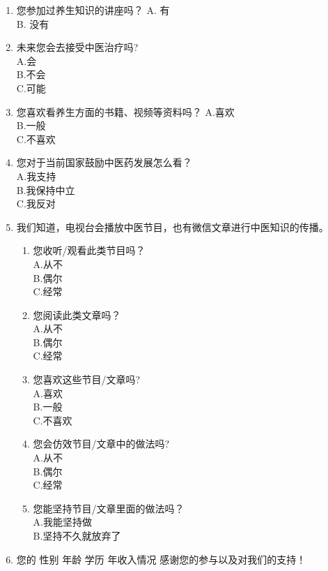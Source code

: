 \begin{enumerate}
\item 
您参加过养生知识的讲座吗？
A. 有\\
B. 没有

\item 
未来您会去接受中医治疗吗?\\
A.会\\
B.不会\\
C.可能


\item 您喜欢看养生方面的书籍、视频等资料吗？
A.喜欢\\
B.一般\\
C.不喜欢\\

\item 
您对于当前国家鼓励中医药发展怎么看？\\
A.我支持\\
B.我保持中立\\
C.我反对

\item 
我们知道，电视台会播放中医节目，也有微信文章进行中医知识的传播。
\begin{enumerate}
	\item 
   您收听/观看此类节目吗？\\
    A.从不\\
    B.偶尔\\
    C.经常

\item 
    您阅读此类文章吗？\\
    A.从不\\
    B.偶尔\\
    C.经常
    
    \item 
    您喜欢这些节目/文章吗?\\
    A.喜欢\\
    B.一般\\
    C.不喜欢
    
    \item 
    您会仿效节目/文章中的做法吗?\\
    A.从不\\
    B.偶尔\\
    C.经常
    
    \item 
   您能坚持节目/文章里面的做法吗？\\
    A.我能坚持做\\
    B.坚持不久就放弃了
	\end{enumerate}
\item 
您的
性别\underline{\makebox[6em]{}}
年龄\underline{\makebox[6em]{}}
学历\underline{\makebox[6em]{}}
年收入情况\underline{\makebox[6em]{}}
\newline
感谢您的参与以及对我们的支持！
\end{enumerate}
